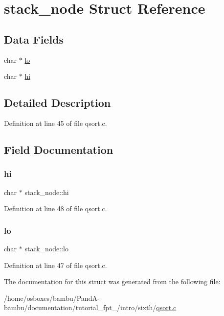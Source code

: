 \hypertarget{structstack__node}{}\section{stack\+\_\+node Struct Reference}
\label{structstack__node}
\subsection*{Data Fields}
\begin{DoxyCompactItemize}
\item 
char $\ast$ \hyperlink{structstack__node_abee4f107a3696d76b96c39755c3d095c}{lo}
\item 
char $\ast$ \hyperlink{structstack__node_ab0ae637cfb8bc4f377c8b35707c3c2e2}{hi}
\end{DoxyCompactItemize}


\subsection{Detailed Description}


Definition at line 45 of file qsort.\+c.



\subsection{Field Documentation}
\mbox{\label{structstack__node_ab0ae637cfb8bc4f377c8b35707c3c2e2}} 
\subsubsection{\texorpdfstring{hi}{hi}}
{\footnotesize\ttfamily char $\ast$ stack\+\_\+node\+::hi}



Definition at line 48 of file qsort.\+c.

\mbox{\label{structstack__node_abee4f107a3696d76b96c39755c3d095c}} 
\subsubsection{\texorpdfstring{lo}{lo}}
{\footnotesize\ttfamily char $\ast$ stack\+\_\+node\+::lo}



Definition at line 47 of file qsort.\+c.



The documentation for this struct was generated from the following file\+:\begin{DoxyCompactItemize}
\item 
/home/osboxes/bambu/\+Pand\+A-\/bambu/documentation/tutorial\+\_\+fpt\+\_/intro/sixth/\hyperlink{tutorial__fpt__2017_2intro_2sixth_2qsort_8c}{qsort.\+c}\end{DoxyCompactItemize}

